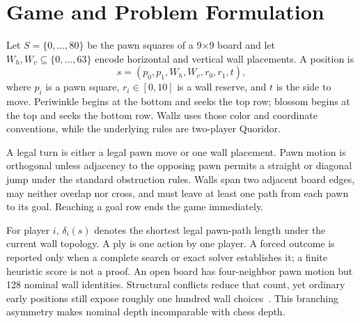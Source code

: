 \section{Game and Problem Formulation}
Let $S=\{0,\ldots,80\}$ be the pawn squares of a 9$\times$9 board and let $W_h,W_v\subseteq\{0,\ldots,63\}$ encode horizontal and vertical wall placements. A position is
\begin{equation}
s=(p_0,p_1,W_h,W_v,r_0,r_1,t),
\end{equation}
where $p_i$ is a pawn square, $r_i\in[0,10]$ is a wall reserve, and $t$ is the side to move. Periwinkle begins at the bottom and seeks the top row; blossom begins at the top and seeks the bottom row. Wallz uses those color and coordinate conventions, while the underlying rules are two-player Quoridor.

A legal turn is either a legal pawn move or one wall placement. Pawn motion is orthogonal unless adjacency to the opposing pawn permits a straight or diagonal jump under the standard obstruction rules. Walls span two adjacent board edges, may neither overlap nor cross, and must leave at least one path from each pawn to its goal. Reaching a goal row ends the game immediately.

For player $i$, $\delta_i(s)$ denotes the shortest legal pawn-path length under the current wall topology. A ply is one action by one player. A forced outcome is reported only when a complete search or exact solver establishes it; a finite heuristic score is not a proof. An open board has four-neighbor pawn motion but 128 nominal wall identities. Structural conflicts reduce that count, yet ordinary early positions still expose roughly one hundred wall choices~\cite{slatton2026article}. This branching asymmetry makes nominal depth incomparable with chess depth.
